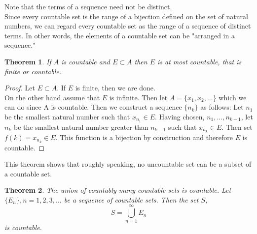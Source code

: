 \documentclass{tufte-book}
\newtheorem{theorem}{Theorem}[chapter]
\theoremstyle{definition}
\numberwithin{section}{chapter}
\begin{document}
Note that the terms of a sequence need not be distinct.\\


\smallskip
Since every countable set is the range of a bijection defined on the set of natural numbers, we can regard every countable set as the range of a sequence of distinct terms.  In other words, the elements of a countable set can be "arranged in a sequence."


\smallskip

\begin{theorem}  If $A$ is countable and $E \subset A$ then $E$ is at most countable, that is finite or countable.   \end{theorem}

\begin{proof}
Let $E \subset A$.
\indent If $E$ is finite, then we are done. \\
\indent On the other hand assume that $E$ is infinite.  Then let $A = \{x_{1}, x_{2}, \ldots\}$ which we can do since A is countable.  Then we construct a sequence $\{n_{k}\}$ as follows:  Let $n_{1}$ be the smallest natural number such that $x_{n_{1}} \in E$.   Having chosen, $n_{1}, \ldots, n_{k-1}$, let $n_{k}$ be the smallest natural number greater than $n_{k-1}$ such that $x_{n_{k}} \in E$.   Then set $f(k) = x_{n_{k}} \in E$.  This function is a bijection by construction and therefore $E$ is countable.

\end{proof}

This theorem shows that roughly speaking, no uncountable set can be a subset of a countable set.

\begin{theorem}  The union of countably many countable sets is countable.   Let $\{E_{n}\} ,  n=1,2,3,\ldots$ be a sequence of countable sets.  Then the set $S$,
\[S = \bigcup_{n=1}^{\infty} E_{n} \] is countable. \end{theorem}
\end{document}
